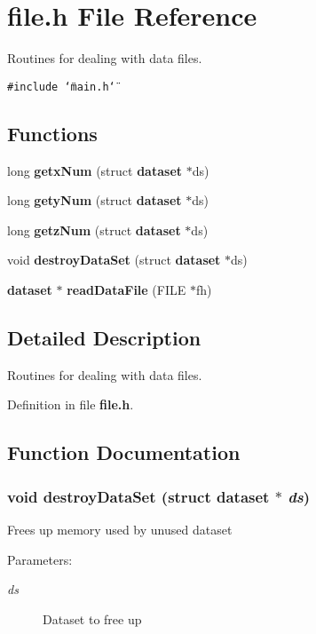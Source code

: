 \section{file.h File Reference}
\label{file_8h}
Routines for dealing with data files.  


{\tt \#include \char`\"{}main.h\char`\"{}}\par
\subsection*{Functions}
\begin{CompactItemize}
\item 
long {\bf getx\-Num} (struct {\bf dataset} $\ast$ds)
\item 
long {\bf gety\-Num} (struct {\bf dataset} $\ast$ds)
\item 
long {\bf getz\-Num} (struct {\bf dataset} $\ast$ds)
\item 
void {\bf destroy\-Data\-Set} (struct {\bf dataset} $\ast$ds)
\item 
{\bf dataset} $\ast$ {\bf read\-Data\-File} (FILE $\ast$fh)
\end{CompactItemize}


\subsection{Detailed Description}
Routines for dealing with data files. 



Definition in file {\bf file.h}.

\subsection{Function Documentation}
\subsubsection{\setlength{\rightskip}{0pt plus 5cm}void destroy\-Data\-Set (struct {\bf dataset} $\ast$ {\em ds})}\label{file_8h_a3}


Frees up memory used by unused dataset

\begin{Desc}
\item[Parameters:]
\begin{description}
\item[{\em ds}]Dataset to free up \end{description}
\end{Desc}


